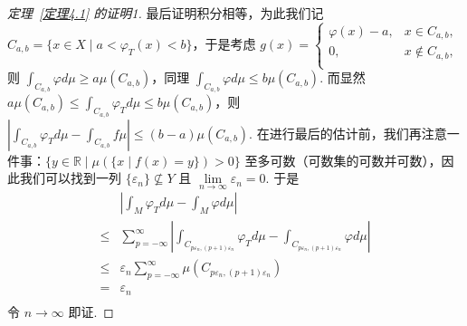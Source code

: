 \documentclass[11pt, a4paper, oneside]{ctexart}
\newcommand{\R}{\mathbb{R}}
\newcommand{\abs}[1]{\left|{#1}\right|}
\begin{document}
\begin{proof}[定理~\ref{定理4.1} 的证明1]
        最后证明积分相等，为此我们记 $C_{a,b}=\{x\in X\mid a<\varphi_T(x)<b\}$，于是考虑 $g(x)=\begin{cases}
            \varphi(x)-a,&x\in C_{a,b},\\
            0,&x\notin C_{a,b},\\
        \end{cases}$ 则 $\int_{C_{a,b}}\varphi d\mu\geq a\mu(C_{a,b})$，同理 $\int_{C_{a,b}}\varphi d\mu\leq b\mu(C_{a,b})$. 而显然 $a\mu(C_{a,b})\leq \int_{C_{a,b}}\varphi_T d\mu \leq b\mu(C_{a,b})$，则 $\abs{\int_{C_{a,b}}\varphi_T d\mu-\int_{C_{a,b}}f\mu}\leq (b-a)\mu(C_{a,b})$. 在进行最后的估计前，我们再注意一件事：$\{y\in\R\mid \mu(\{x\mid f(x)=y\})>0\}$ 至多可数（可数集的可数并可数），因此我们可以找到一列 $\{\varepsilon_n\}\nsubseteq Y$ 且 $\lim\limits_{n\to\infty}\varepsilon_n=0$. 于是
        \begin{equation*}
            \begin{aligned}
                &\abs{\int_{M}\varphi_T d\mu-\int_{M}\varphi d\mu}\\
                \leq&\sum\limits_{p=-\infty}^{\infty}\abs{\int_{C_{p\varepsilon_n,(p+1)\varepsilon_n}}\varphi_T d\mu-\int_{C_{p\varepsilon_n,(p+1)\varepsilon_n}}\varphi d\mu}\\
                \leq&\varepsilon_n\sum\limits_{p=-\infty}^{\infty}\mu(C_{p\varepsilon_n,(p+1)\varepsilon_n})\\
                =&\varepsilon_n\\
            \end{aligned}
        \end{equation*}
        令 $n\to\infty$ 即证.
    \end{proof}
\end{document}
